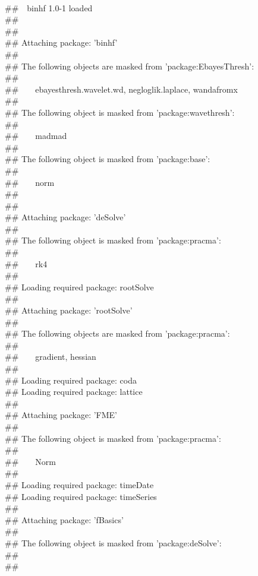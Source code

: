 \documentclass{article}\usepackage[]{graphicx}\usepackage[]{color}
\makeatletter
\newenvironment{kframe}{%
 \def\at@end@of@kframe{}%
 \ifinner\ifhmode%
  \def\at@end@of@kframe{\end{minipage}}%
  \begin{minipage}{\columnwidth}%
 \fi\fi%
 \def\FrameCommand##1{\hskip\@totalleftmargin \hskip-\fboxsep
 \colorbox{shadecolor}{##1}\hskip-\fboxsep
     \hskip-\linewidth \hskip-\@totalleftmargin \hskip\columnwidth}%
 \MakeFramed {\advance\hsize-\width
   \@totalleftmargin\z@ \linewidth\hsize
   \@setminipage}}%
 {\par\unskip\endMakeFramed%
 \at@end@of@kframe}
\newenvironment{knitrout}{}{} %
\makeatother
\begin{document}
\begin{knitrout}
\begin{kframe}
\\\#\#\ \ binhf 1.0-1 loaded\\\#\# \\\#\# \\\#\# Attaching package: 'binhf'\\\#\# \\\#\# The following objects are masked from 'package:EbayesThresh':\\\#\# \\\#\#\ \ \ \  ebayesthresh.wavelet.wd, negloglik.laplace, wandafromx\\\#\# \\\#\# The following object is masked from 'package:wavethresh':\\\#\# \\\#\#\ \ \ \  madmad\\\#\# \\\#\# The following object is masked from 'package:base':\\\#\# \\\#\#\ \ \ \  norm\\\#\# \\\#\# \\\#\# Attaching package: 'deSolve'\\\#\# \\\#\# The following object is masked from 'package:pracma':\\\#\# \\\#\#\ \ \ \  rk4\\\#\# \\\#\# Loading required package: rootSolve\\\#\# \\\#\# Attaching package: 'rootSolve'\\\#\# \\\#\# The following objects are masked from 'package:pracma':\\\#\# \\\#\#\ \ \ \  gradient, hessian\\\#\# \\\#\# Loading required package: coda\\\#\# Loading required package: lattice\\\#\# \\\#\# Attaching package: 'FME'\\\#\# \\\#\# The following object is masked from 'package:pracma':\\\#\# \\\#\#\ \ \ \  Norm\\\#\# \\\#\# Loading required package: timeDate\\\#\# Loading required package: timeSeries\\\#\# \\\#\# Attaching package: 'fBasics'\\\#\# \\\#\# The following object is masked from 'package:deSolve':\\\#\# \\\#\#\ \ \ 
\end{kframe}
\end{knitrout}
\end{document}
